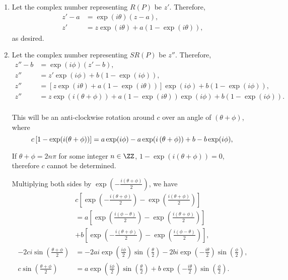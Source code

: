 \Question{\currfilebase}

\begin{enumerate}
    \item Let the complex number representing \(R(P)\) be \(z'\). Therefore,
    \begin{align*}
        z' - a &= \exp(i\theta) (z - a),\\
        z' &= z \exp(i\theta) + a (1 - \exp(i\theta)),
    \end{align*}
    as desired.

    \item Let the complex number representing \(SR(P)\) be \(z''\). Therefore,
    \begin{align*}
        z'' - b &= \exp(i\phi) (z' - b),\\
        z'' &= z' \exp(i\phi) + b(1 - \exp(i\phi)),\\
        z'' &= \left[z \exp(i\theta) + a (1 - \exp(i\theta))\right] \exp(i\phi) + b(1 - \exp(i\phi)),\\
        z'' &= z\exp(i\left(\theta + \phi\right)) + a (1 - \exp(i \theta)) \exp(i \phi) + b (1 - \exp(i \phi)).\\
    \end{align*}

    This will be an anti-clockwise rotation around \(c\) over an angle of \((\theta + \phi)\), where
    \[
        c \left[1 - \exp(i (\theta + \phi))\right] = a \exp(i \phi) - a\exp(i \left(\theta + \phi\right)) + b - b \exp(i \phi),\\
    \]

    If \(\theta + \phi = 2n\pi\) for some integer \(n \in \ZZ\), \(1 - \exp(i (\theta + \phi)) = 0\), therefore \(c\) cannot be determined.

    Multiplying both sides by \(\exp\left(-\frac{i(\theta + \phi)}{2}\right)\), we have
    \begin{align*}
        &c \left[\exp\left(-\frac{i(\theta + \phi)}{2}\right) - \exp\left(\frac{i (\theta + \phi)}{2}\right)\right]\\
        &= a \left[\exp\left(\frac{i(\phi - \theta)}{2}\right) - \exp\left(\frac{i(\theta + \phi)}{2}\right)\right]\\
        &+ b\left[\exp\left(-\frac{i(\theta + \phi)}{2}\right) - \exp\left(\frac{i(\phi - \theta)}{2}\right)\right],\\
        -2ci\sin\left(\frac{\theta + \phi}{2}\right) &= - 2 ai \exp\left(\frac{i\phi}{2}\right) \sin \left(\frac{\theta}{2}\right) - 2 bi \exp\left(-\frac{i\theta}{2}\right) \sin \left(\frac{\phi}{2}\right),\\
        c \sin\left(\frac{\theta + \phi}{2}\right) &= a \exp\left(\frac{i\phi}{2}\right) \sin \left(\frac{\theta}{2}\right) + b \exp\left(-\frac{i\theta}{2}\right) \sin \left(\frac{\phi}{2}\right).
    \end{align*}


\end{enumerate}
